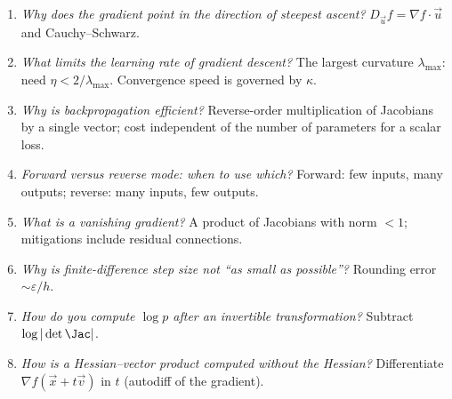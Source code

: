 \begin{interview}
\begin{enumerate}
  \item \emph{Why does the gradient point in the direction of steepest ascent?} $D_{\vec u}f=\nabla f\cdot\vec u$ and Cauchy--Schwarz.
  \item \emph{What limits the learning rate of gradient descent?} The largest curvature $\lambda_{\max}$: need $\eta<2/\lambda_{\max}$. Convergence speed is governed by $\kappa$.
  \item \emph{Why is backpropagation efficient?} Reverse-order multiplication of Jacobians by a single vector; cost independent of the number of parameters for a scalar loss.
  \item \emph{Forward versus reverse mode: when to use which?} Forward: few inputs, many outputs; reverse: many inputs, few outputs.
  \item \emph{What is a vanishing gradient?} A product of Jacobians with norm $<1$; mitigations include residual connections.
  \item \emph{Why is finite-difference step size not ``as small as possible''?} Rounding error $\sim\varepsilon/h$.
  \item \emph{How do you compute $\log p$ after an invertible transformation?} Subtract $\log|\det\Jac|$.
  \item \emph{How is a Hessian--vector product computed without the Hessian?} Differentiate $\nabla f(\vec x+t\vec v)$ in $t$ (autodiff of the gradient).
\end{enumerate}
\end{interview}

